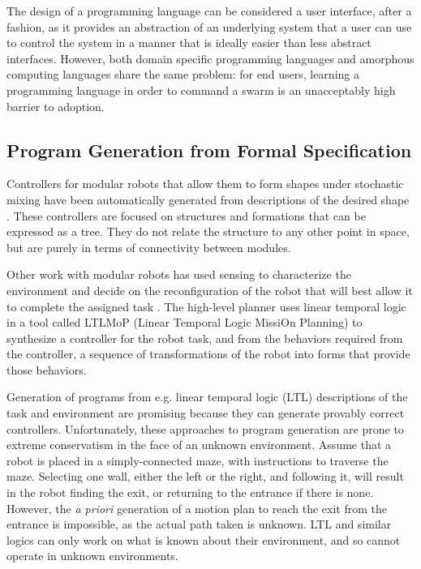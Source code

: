 The design of a programming language can be considered a user interface, after a fashion, as it provides an abstraction of an underlying system that a user can use to control the system in a manner that is ideally easier than less abstract interfaces. 
However, both domain specific programming languages and amorphous computing languages share the same problem: for end users, learning a programming language in order to command a swarm is an unacceptably high barrier to adoption. 

\subsection{Program Generation from Formal Specification} \label{section:Program_Generation}

Controllers for modular robots that allow them to form shapes under stochastic mixing have been automatically generated from descriptions of the desired shape \citep{klavins2002automatic}. 
These controllers are focused on structures and formations that can be expressed as a tree. 
They do not relate the structure to any other point in space, but are purely in terms of connectivity between modules. 

Other work with modular robots has used sensing to characterize the environment and decide on the reconfiguration of the robot that will best allow it to complete the assigned task \citep{daudelin2017integrated, jing2016end}.
The high-level planner uses linear temporal logic in a tool called LTLMoP (Linear Temporal Logic MissiOn Planning) to synthesize a controller for the robot task, and from the behaviors required from the controller, a sequence of transformations of the robot into forms that provide those behaviors. 
	
Generation of programs from e.g. linear temporal logic (LTL) descriptions of the task and environment are promising because they can generate provably correct controllers.
Unfortunately, these approaches to program generation are prone to extreme conservatism in the face of an unknown environment. 
Assume that a robot is placed in a simply-connected maze, with instructions to traverse the maze. 
Selecting one wall, either the left or the right, and following it, will result in the robot finding the exit, or returning to the entrance if there is none. 
However, the \emph{a priori} generation of a motion plan to reach the exit from the entrance is impossible, as the actual path taken is unknown. 
LTL and similar logics can only work on what is known about their environment, and so cannot operate in unknown environments. 
	
